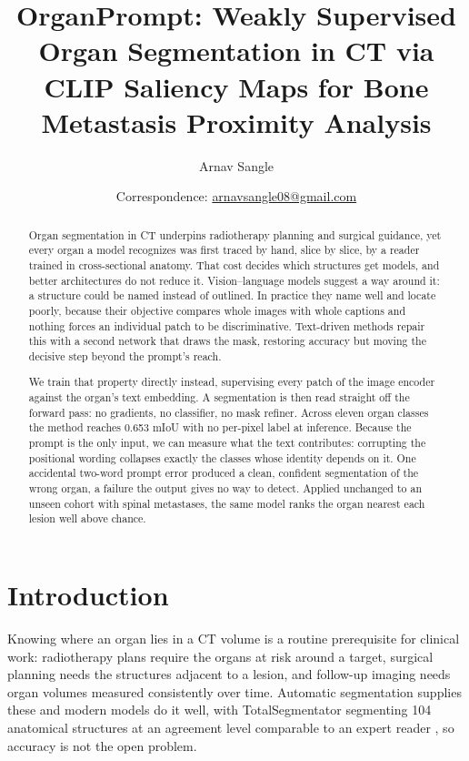 \documentclass[10pt]{article}
\title{\bfseries OrganPrompt: Weakly Supervised Organ Segmentation in CT via CLIP       Saliency Maps for Bone Metastasis Proximity Analysis}
\author[1]{Arnav Sangle}
\affil[1]{\small Ranchview High School}
\date{\small Correspondence:
\href{mailto:arnavsangle08@gmail.com}{arnavsangle08@gmail.com}}
\begin{document}
\maketitle

\begin{abstract}
Organ segmentation in CT underpins radiotherapy planning and surgical guidance,
yet every organ a model recognizes was first traced by hand, slice by slice, by a
reader trained in cross-sectional anatomy. That cost decides which structures get
models, and better architectures do not reduce it. Vision--language models suggest
a way around it: a structure could be named instead of outlined. In practice they
name well and locate poorly, because their objective compares whole images with
whole captions and nothing forces an individual patch to be discriminative.
Text-driven methods repair this with a second network that draws the mask,
restoring accuracy but moving the decisive step beyond the prompt's reach.

We train that property directly instead, supervising every patch of the image
encoder against the organ's text embedding. A segmentation is then read straight
off the forward pass: no gradients, no classifier, no mask refiner. Across eleven
organ classes the method reaches 0.653 mIoU with no per-pixel label at inference.
Because the prompt is the only input, we can measure what the text contributes:
corrupting the positional wording collapses exactly the classes whose identity
depends on it. One accidental two-word prompt error produced a clean, confident
segmentation of the wrong organ, a failure the output gives no way to detect.
Applied unchanged to an unseen cohort with spinal metastases, the same model
ranks the organ nearest each lesion well above chance.
\end{abstract}

\section{Introduction}
\label{sec:intro}

Knowing where an organ lies in a CT volume is a routine prerequisite for clinical
work: radiotherapy plans require the organs at risk around a target, surgical
planning needs the structures adjacent to a lesion, and follow-up imaging needs
organ volumes measured consistently over time. Automatic segmentation supplies
these and modern models do it well, with TotalSegmentator segmenting 104
anatomical structures at an agreement level comparable to an expert reader
\cite{wasserthal2023totalsegmentator}, so accuracy is not the open problem.
\end{document}
